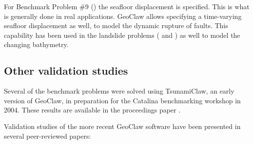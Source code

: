 For Benchmark Problem \#9 () the seafloor displacement is
specified.  This is what is generally done in real applications.  GeoClaw
allows specifying a time-varying seafloor displacement as well, to model the
dynamic rupture of faults.  This capability has been used in the landslide
problems ( and ) as well to model the changing
bathymetry.



\subsection{Other validation studies}

Several of the benchmark problems were solved using TsunamiClaw, an early
version of GeoClaw, in preparation for the Catalina
benchmarking workshop in 2004.  These results are available in the
proceedings paper \cite{rjl-george:catalina04a}.

Validation studies of the more 
recent GeoClaw software have been presented in several
peer-reviewed papers:

